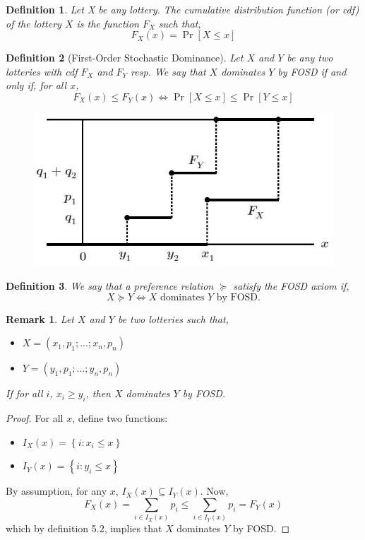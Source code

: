 \documentclass[12pt]{report}
\newtheorem{definition}{Definition}[chapter]
\newtheorem{remark}{Remark}[chapter]
\newcommand{\Prob}[1]{\operatorname{Pr}\left[#1\right]}
\begin{document}
\begin{definition}
Let X be any lottery. The cumulative distribution function (or cdf) of the lottery $X$ is the function $F_X$ such that, $$F_X(x) = \Prob{X\leq x} $$
\end{definition}

\begin{definition}[First-Order Stochastic Dominance]
Let $X$ and $Y$ be any two lotteries with cdf $F_X$ and $F_Y$ resp. We say that $X$ dominates $Y$ by FOSD if and only if, for all $x$, $$F_X(x) \leq F_Y(x) \Leftrightarrow  \Prob{X\leq x} \leq \Prob{Y\leq x} $$
\end{definition}

\begin{figure}[ht!]
\centering
\includegraphics[scale=0.45]{images/fosd}
\end{figure}

\begin{definition}
We say that a preference relation $\succeq$ satisfy the FOSD axiom if, $$X\succeq Y \Leftrightarrow X\text{ dominates } Y \text{ by FOSD.} $$
\end{definition}

\begin{remark}
Let $X$ and $Y$ be two lotteries such that,\begin{itemize}
\item $X = (x_1, p_1; ... ; x_n, p_n)$
\item $Y = (y_1, p_1; ... ; y_n, p_n)$
\end{itemize} If for all $i$, $x_i \geq y_i$, then $X$ dominates $Y$ by FOSD.
\end{remark}

\begin{proof}
For all $x$, define two functions:\begin{itemize}
\item $I_X(x) = \left\lbrace i: x_i\leq x\right\rbrace$
\item $I_Y(x) = \left\lbrace i: y_i\leq x\right\rbrace$
\end{itemize}
By assumption, for any $x$, $I_X(x)\subseteq I_Y(x)$. Now, $$F_X(x) = \sum_{i\in I_X(x)} p_i \leq \sum_{i\in I_Y(x)} p_i = F_Y(x) $$ which by definition 5.2, implies that $X$ dominates $Y$ by FOSD.
\end{proof}
\end{document}
